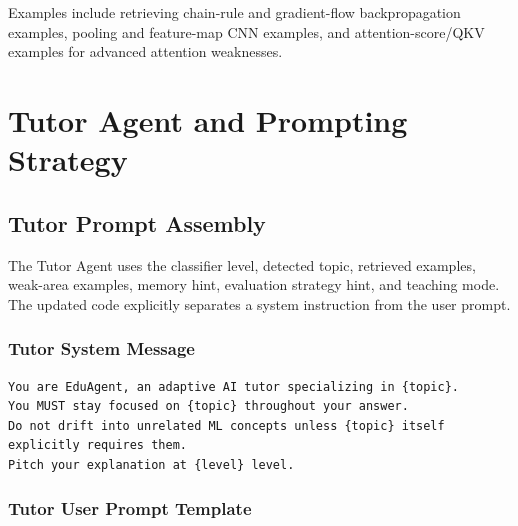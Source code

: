 \documentclass[11pt,a4paper]{article}
\begin{document}
Examples include retrieving chain-rule and gradient-flow backpropagation examples, pooling and feature-map CNN examples, and attention-score/QKV examples for advanced attention weaknesses.

\section{Tutor Agent and Prompting Strategy}

\subsection{Tutor Prompt Assembly}

The Tutor Agent uses the classifier level, detected topic, retrieved examples, weak-area examples, memory hint, evaluation strategy hint, and teaching mode. The updated code explicitly separates a system instruction from the user prompt.

\subsubsection{Tutor System Message}

\begin{lstlisting}
You are EduAgent, an adaptive AI tutor specializing in {topic}.
You MUST stay focused on {topic} throughout your answer.
Do not drift into unrelated ML concepts unless {topic} itself explicitly requires them.
Pitch your explanation at {level} level.
\end{lstlisting}

\subsubsection{Tutor User Prompt Template}
\end{document}

